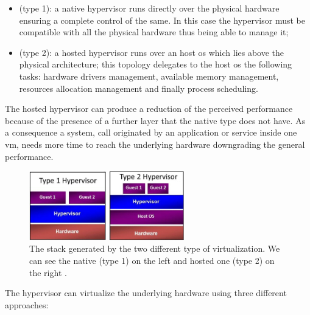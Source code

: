 \begin{itemize}
	\item{ (type 1): a native hypervisor runs directly over the physical hardware ensuring
		a complete control of the same. In this case the hypervisor must be compatible with all the physical
		hardware thus being able to manage it;}
	\item{ (type 2): a hosted hypervisor runs over an host \acs{os} which lies above the
		physical architecture; this topology delegates to the host \acs{os} the following tasks: hardware
		drivers management, available memory management, resources allocation management and finally process
		scheduling.}
\end{itemize}

The hosted hypervisor can produce a reduction of the perceived performance because of the presence of a 
further layer that the native type does not have. As a consequence a system, call originated by an 
application or service inside one \ac{vm}, needs more time to reach the underlying hardware downgrading 
the general performance.

\begin{figure}
	\centering{}
	\includegraphics[width=0.6\textwidth]{chapters/problem/images/virtualization-types.png}
	\caption[Virtualization types]{The stack generated by the two different type of virtualization.
		We can see the native (type 1) on the left and hosted one (type 2) on the right
		\cite{virtualizationTypes}.}
	\label{img:problemSpace-paas-virtualization-assets-virtualizationTypes}
\end{figure}

The hypervisor can virtualize the underlying hardware using three different approaches:

